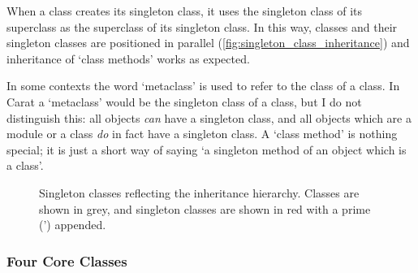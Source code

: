 When a class creates its singleton class, it uses the singleton class of its superclass as the superclass of its singleton class. In this way, classes and their singleton classes are positioned in parallel (\autoref{fig:singleton_class_inheritance}) and inheritance of `class methods' works as expected.

In some contexts the word `metaclass' is used to refer to the class of a class. In Carat a `metaclass' would be the singleton class of a class, but I do not distinguish this: all objects \textit{can} have a singleton class, and all objects which are a module or a class \textit{do} in fact have a singleton class. A `class method' is nothing special; it is just a short way of saying `a singleton method of an object which is a class'.

\begin{figure}
\begin{center}
\caption{Singleton classes reflecting the inheritance hierarchy. Classes are shown in grey, and singleton classes are shown in red with a prime (') appended.}
\label{fig:singleton_class_inheritance}
\end{center}
\end{figure}

\subsubsection{Four Core Classes}

